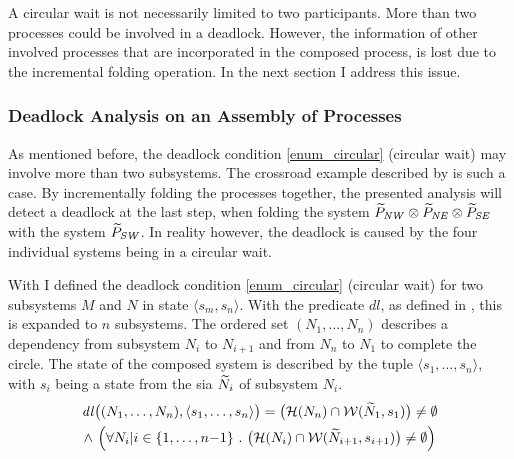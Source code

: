
A circular wait is not necessarily limited to two participants.
More than two processes could be involved in a deadlock.
However, the information of other involved processes that are incorporated in the composed process, is lost due to the incremental folding operation.
In the next section I address this issue.


\subsubsection{Deadlock Analysis on an Assembly of Processes}
\label{sect_block_dl_assembly}

As mentioned before, the deadlock condition \ref{enum_circular} (circular wait) may involve more than two subsystems.
The crossroad example described by \Fig{\ref{fig_cross_proc_sia_dl}} is such a case.
By incrementally folding the processes together, the presented analysis will detect a deadlock at the last step, when folding the system $\widetilde{P}_{\mathit{NW}} \otimes \widetilde{P}_{\mathit{NE}} \otimes \widetilde{P}_{\mathit{SE}}$ with the system $\widetilde{P}_{\mathit{SW}}$.
In reality however, the deadlock is caused by the four individual systems being in a circular wait.

With \Equ{\ref{eq_circular2}} I defined the deadlock condition \ref{enum_circular} (circular wait) for two subsystems $M$ and $N$ in state $\langle s_m, s_n \rangle$.
With the predicate $\mathit{dl}$, as defined in \Equ{\ref{eq_circularn}}, this is expanded to $n$ subsystems.
The ordered set $(N_1, \dots, N_n)$ describes a dependency from subsystem $N_i$ to $N_{i+1}$ and from $N_n$ to $N_1$ to complete the circle.
The state of the composed system is described by the tuple $\langle s_1, \dots, s_n \rangle$, with $s_i$ being a state from the \gls{sia} $\widetilde{N}_i$ of subsystem $N_i$.
\begin{multline}
    \label{eq_circularn}
    \mathit{dl} \big ( (N_1, \dots, N_n), \langle s_1, \dots, s_n \rangle \big ) = \big ( \mathcal{H}(N_n) \cap \mathcal{W}(\widetilde{N}_1, s_1) \big ) \neq \emptyset \\
    \land \ \Big ( \forall N_i | i \in \{1, \dots, n{-}1\}\ .\ \big ( \mathcal{H}(N_i) \cap \mathcal{W}(\widetilde{N}_{i+1}, s_{i+1}) \big ) \neq \emptyset \Big )
\end{multline}

